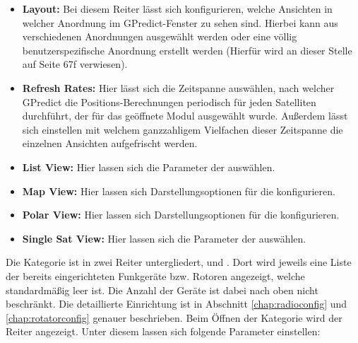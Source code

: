 \begin{itemize}
	\parskip0pt
	\item \textbf{Layout:} Bei diesem Reiter lässt sich konfigurieren, welche Ansichten in welcher Anordnung im GPredict-Fenster zu sehen sind. Hierbei kann aus verschiedenen Anordnungen ausgewählt werden oder eine völlig benutzerspezifische Anordnung erstellt werden (Hierfür wird an dieser Stelle auf \cite{gpredictmanual} Seite 67f verwiesen).
	\item \textbf{Refresh Rates:} Hier lässt sich die Zeitspanne auswählen, nach  welcher GPredict die Positions-Berechnungen periodisch für jeden Satelliten durchführt, der für das geöffnete Modul ausgewählt wurde. Außerdem lässt sich einstellen mit welchem ganzzahligem Vielfachen dieser Zeitspanne die einzelnen Ansichten aufgefrischt werden.
	\item \textbf{List View:} Hier lassen sich die Parameter der  auswählen.
	\item \textbf{Map View:} Hier lassen sich Darstellungsoptionen für die  konfigurieren.
	\item \textbf{Polar View:} Hier lassen sich Darstellungsoptionen für die  konfigurieren.
	\item \textbf{Single Sat View:} Hier lassen sich die Parameter der  auswählen.
\end{itemize}

Die Kategorie  ist in zwei Reiter untergliedert,  und . Dort wird jeweils eine Liste der bereits eingerichteten Funkgeräte bzw. Rotoren angezeigt, welche standardmäßig leer ist. Die Anzahl der Geräte ist dabei nach oben nicht beschränkt. Die detaillierte Einrichtung ist in Abschnitt \ref{chap:radioconfig} und \ref{chap:rotatorconfig} genauer beschrieben.\newpar
Beim Öffnen der Kategorie  wird der Reiter  angezeigt. Unter diesem lassen sich folgende Parameter einstellen:

